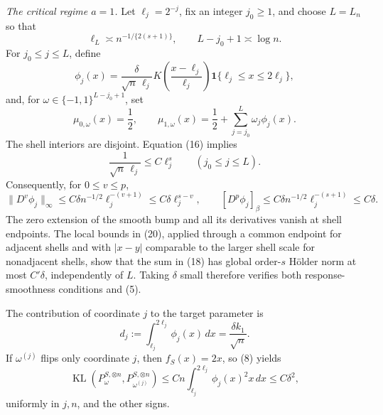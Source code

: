 \emph{The critical regime \(a=1\).}
Let \(\ell_j=2^{-j}\), fix an integer \(j_0\ge1\), and choose \(L=L_n\) so that
\[
 \ell_L\asymp n^{-1/\{2(s+1)\}},
 \qquad L-j_0+1\asymp\log n.
\tag{16}
\]
For \(j_0\le j\le L\), define
\[
 \phi_j(x)=\frac{\delta}{\sqrt n\,\ell_j}
 K\!\left(\frac{x-\ell_j}{\ell_j}\right)
 \mathbf 1\{\ell_j\le x\le2\ell_j\},
\tag{17}
\]
and, for \(\omega\in\{-1,1\}^{L-j_0+1}\), set
\[
 \mu_{0,\omega}(x)=\frac12,
 \qquad
 \mu_{1,\omega}(x)=\frac12+
 \sum_{j=j_0}^L\omega_j\phi_j(x).
\tag{18}
\]
The shell interiors are disjoint.  Equation (16) implies
\[
 \frac1{\sqrt n\,\ell_j}\le C\ell_j^s
 \qquad(j_0\le j\le L).
\tag{19}
\]
Consequently, for \(0\le v\le p\),
\[
 \lVert D^v\phi_j\rVert_\infty
 \le C\delta n^{-1/2}\ell_j^{-(v+1)}
 \le C\delta\ell_j^{s-v},
 \qquad
 [D^p\phi_j]_{\beta}
 \le C\delta n^{-1/2}\ell_j^{-(s+1)}
 \le C\delta.
\tag{20}
\]
The zero extension of the smooth bump and all its derivatives vanish at shell endpoints.  The local bounds in (20), applied through a common endpoint for adjacent shells and with \(|x-y|\) comparable to the larger shell scale for nonadjacent shells, show that the sum in (18) has global order-\(s\) H\"older norm at most \(C'\delta\), independently of \(L\).  Taking \(\delta\) small therefore verifies both response-smoothness conditions and (5).

The contribution of coordinate \(j\) to the target parameter is
\[
 d_j:=\int_{\ell_j}^{2\ell_j}\phi_j(x)\,dx
 =\frac{\delta k_1}{\sqrt n}.
\tag{21}
\]
If \(\omega^{(j)}\) flips only coordinate \(j\), then \(f_S(x)=2x\), so (8) yields
\[
 \operatorname{KL}(P_\omega^{S,\otimes n},
                    P_{\omega^{(j)}}^{S,\otimes n})
 \le Cn\int_{\ell_j}^{2\ell_j}\phi_j(x)^2x\,dx
 \le C\delta^2,
\tag{22}
\]
uniformly in \(j,n\), and the other signs.

